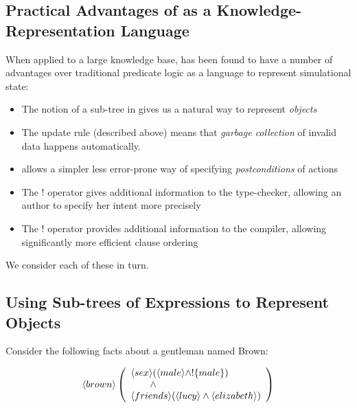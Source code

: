 \subsection{Practical Advantages of \ELABR{} as a Knowledge-Representation Language}

\NI When applied to a large knowledge base, \ELFULL{} has been found
to have a number of advantages over traditional predicate logic as a
language to represent simulational state:
\begin{itemize}
\item
The notion of a sub-tree in \ELABR{} gives us a natural way to represent \emph{objects}
\item
The update rule (described above) means that \emph{garbage collection} of invalid data happens automatically.
\item
\ELABR{} allows a simpler less error-prone way of specifying \emph{postconditions} of actions
\item
The $!$ operator gives additional information to the type-checker, allowing an author to specify her intent more precisely
\item
The $!$ operator provides additional information to the compiler, allowing significantly more efficient clause ordering
\end{itemize}
We consider  each of these in turn.

\subsection{Using Sub-trees of Expressions to Represent Objects}
Consider the following facts about a gentleman named Brown:

\[
   \langle brown \rangle \left(
   \begin{array}{l}
     \langle sex \rangle (\langle male \rangle \land ! \{male\}) \\
        \qquad \land \\
     \langle friends \rangle (\langle lucy \rangle \land \langle elizabeth \rangle ) 
   \end{array}
   \right)
\]

